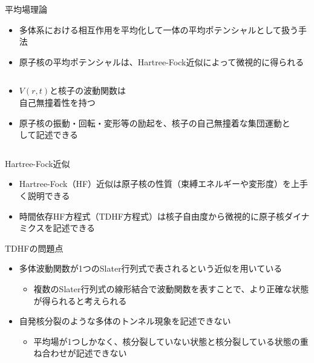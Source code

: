 \documentclass[14pt,aspectratio=169,xcolor=dvipsnames,table,dvipdfmx]{beamer}
\theoremstyle{definition}
\begin{document}
\begin{frame}{平均場理論}
  \begin{itemize}
    \item 多体系における相互作用を平均化して一体の平均ポテンシャルとして扱う手法
    \item 原子核の平均ポテンシャルは、Hartree-Fock近似によって微視的に得られる
  \end{itemize}
  \begin{columns}[t]
    \begin{column}{.5\textwidth}
      \begin{itemize}
        \item $V(r,t)$と核子の波動関数は\\自己無撞着性を持つ
        \item 原子核の振動・回転・変形等の励起を、{\color{AlertOrange}核子の自己無撞着な集団運動}として記述できる
      \end{itemize}
    \end{column}
    \begin{column}{.5\textwidth}
    \end{column}
  \end{columns}
\end{frame}
\begin{frame}{Hartree-Fock近似}
  \begin{itemize}
    \item Hartree-Fock（HF）近似は原子核の性質（束縛エネルギーや変形度）を上手く説明できる
    \item 時間依存HF方程式（TDHF方程式）は核子自由度から微視的に原子核ダイナミクスを記述できる
  \end{itemize}
  \begin{block}{TDHFの問題点}
    \begin{itemize}
      \item 多体波動関数が1つのSlater行列式で表されるという近似を用いている
            \begin{itemize}
              \item 複数のSlater行列式の線形結合で波動関数を表すことで、より正確な状態が得られると考えられる
            \end{itemize}
      \item 自発核分裂のような{\color{AlertOrange}多体のトンネル現象}を記述できない
            \begin{itemize}
              \item 平均場が1つしかなく、核分裂していない状態と核分裂している状態の重ね合わせが記述できない
            \end{itemize}
    \end{itemize}
  \end{block}
\end{frame}
\end{document}
